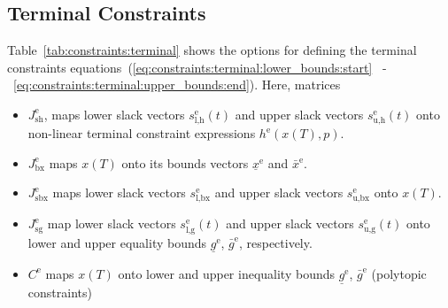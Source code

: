 \documentclass[english]{article}
\newcommand{\ind}[1]{_{\textrm{#1}}}
\newcommand{\terminal}{^{\textrm{e}}}
\begin{document}
\subsection{Terminal Constraints}\label{sec:constraints:terminal}
%
Table~\ref{tab:constraints:terminal} shows the options for defining the terminal constraints equations~(\ref{eq:constraints:terminal:lower_bounds:start} ~-~\ref{eq:constraints:terminal:upper_bounds:end}).
Here, matrices
\begin{itemize}
    \item $J\ind{sh}\terminal$, maps lower slack vectors $s\ind{l,h}\terminal(t)$ and upper slack vectors $s\ind{u,h}\terminal(t)$ onto non-linear terminal constraint expressions $h\terminal(x(T), p)$.
    \item $J\ind{bx}\terminal$ maps $x(T)$ onto its bounds vectors $\underline{x}\terminal$ and $\bar{x}\terminal$.
    \item $J\ind{sbx}\terminal$ maps lower slack vectors $s\ind{l,bx}\terminal$ and upper slack vectors $s\ind{u,bx}\terminal$ onto $x(T)$.
    \item $J\ind{sg}\terminal$ map lower slack vectors $s\ind{l,g}\terminal(t)$ and upper slack vectors $s\ind{u,g}\terminal(t)$ onto lower and upper equality bounds $\underline{g}\terminal$, $\bar{g}\terminal$, respectively.
    \item $C\terminal$ maps $x(T)$ onto lower and upper inequality bounds $\underline{g}\terminal$, $\bar{g}\terminal$ (polytopic constraints)
\end{itemize}
%
\end{document}
